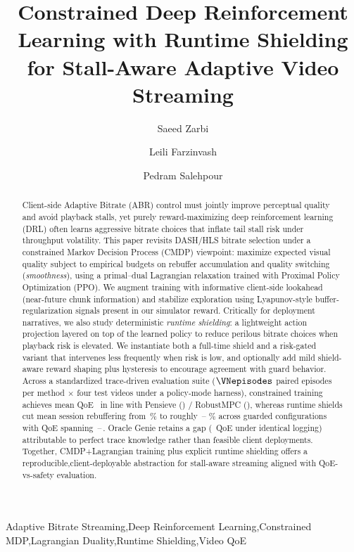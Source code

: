 \documentclass[preprint,12pt]{elsarticle}
\begin{document}
\begin{frontmatter}

\title{Constrained Deep Reinforcement Learning with Runtime Shielding\\ for Stall-Aware Adaptive Video Streaming}

\author[uta]{Saeed Zarbi}
\author[uta]{Leili Farzinvash}
\author[uta]{Pedram Salehpour}

\address[uta]{Department of Computer Engineering, Faculty of Electrical and Computer Engineering, University of Tabriz, Tabriz, Iran}

\begin{abstract}
Client-side Adaptive Bitrate (ABR) control must jointly improve perceptual quality and avoid playback stalls, yet purely reward-maximizing deep reinforcement learning (DRL) often learns aggressive bitrate choices that inflate tail stall risk under throughput volatility.
This paper revisits DASH/HLS bitrate selection under a constrained Markov Decision Process (CMDP) viewpoint: maximize expected visual quality subject to empirical budgets on rebuffer accumulation and quality switching (\emph{smoothness}), using a primal--dual Lagrangian relaxation trained with Proximal Policy Optimization (PPO).
We augment training with informative client-side lookahead (near-future chunk information) and stabilize exploration using Lyapunov-style buffer-regularization signals present in our simulator reward.
Critically for deployment narratives, we also study deterministic \textit{runtime shielding}: a lightweight action projection layered on top of the learned policy to reduce perilous bitrate choices when playback risk is elevated. We instantiate both a full-time shield and a risk-gated variant that intervenes less frequently when risk is low, and optionally add mild shield-aware reward shaping plus hysteresis to encourage agreement with guard behavior.
Across a standardized trace-driven evaluation suite ($\VNepisodes$ paired episodes per method $\times$ four test videos under a policy-mode harness), constrained training achieves mean QoE \VQoNoShield\, in line with Pensieve (\VQoPen) / RobustMPC (\VQoMPC), whereas runtime shields cut mean session rebuffering from \VRbNoShield\,\%{} to roughly \VRbShieldLo\,--\,\VRbShieldHi\,\%{} across guarded configurations with QoE spanning \VQoShield\,--\,\VQoRiskGate.
Oracle Genie retains a gap (\VQoGenie\, QoE under identical logging) attributable to perfect trace knowledge rather than feasible client deployments.
Together, CMDP+Lagrangian training plus explicit runtime shielding offers a reproducible,\linebreak client-deployable abstraction for stall-aware streaming aligned with QoE-vs-safety evaluation.
\end{abstract}

\begin{keyword}
Adaptive Bitrate Streaming\sep Deep Reinforcement Learning\sep Constrained MDP\sep Lagrangian Duality\sep Runtime Shielding\sep Video QoE
\end{keyword}

\end{frontmatter}
\end{document}
